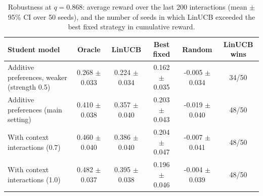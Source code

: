 \begin{table}[t]
\caption{Robustness at $q=0.868$: average reward over the last 200 interactions (mean $\pm$ 95\% CI over 50 seeds), and the number of seeds in which LinUCB exceeded the best fixed strategy in cumulative reward.}
\label{tab:adaptation_robust}
\centering
\footnotesize
\begin{tabular}{p{}ccccc}
\hline
\textbf{Student model} & \textbf{Oracle} & \textbf{LinUCB} & \textbf{Best fixed} & \textbf{Random} & \textbf{LinUCB wins} \\
\hline
Additive preferences, weaker (strength 0.5) & 0.268 $\pm$ 0.033 & 0.224 $\pm$ 0.034 & 0.162 $\pm$ 0.035 & -0.005 $\pm$ 0.034 & 34/50 \\
Additive preferences (main setting) & 0.410 $\pm$ 0.038 & 0.357 $\pm$ 0.040 & 0.203 $\pm$ 0.043 & -0.019 $\pm$ 0.040 & 48/50 \\
With context interactions (0.7) & 0.460 $\pm$ 0.040 & 0.386 $\pm$ 0.040 & 0.204 $\pm$ 0.047 & -0.007 $\pm$ 0.041 & 48/50 \\
With context interactions (1.0) & 0.482 $\pm$ 0.037 & 0.395 $\pm$ 0.038 & 0.196 $\pm$ 0.046 & -0.004 $\pm$ 0.039 & 48/50 \\
\hline
\end{tabular}
\end{table}
